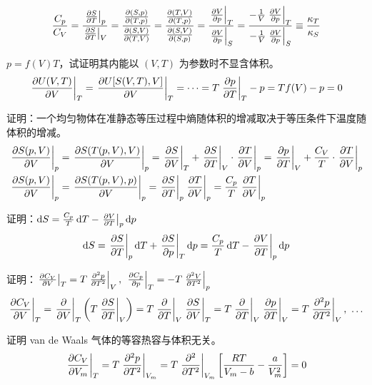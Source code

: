 \[
    \frac{C_p}{C_V} = \frac{\left.\pdv{S}{T}\right|_p}{\left.\pdv{S}{T}\right|_V} = \frac{\pdv{(S, p)}{(T, p)}}{\pdv{(S, V)}{(T, V)}} = \frac{\pdv{(T, V)}{(T, p)}}{\pdv{(S, V)}{(S, p)}} = \frac{\left.\pdv{V}{p}\right|_T}{\left.\pdv{V}{p}\right|_S} = \frac{- \frac{1}{V} \left.\pdv{V}{p}\right|_T}{- \frac{1}{V} \left.\pdv{V}{p}\right|_S} \equiv \frac{\kappa_T}{\kappa_S}
\]

\begin{framed}
    $p = f(V) T$，试证明其内能以 $(V, T)$ 为参数时不显含体积。
    \[
        \left.\pdv{U(V, T)}{V}\right|_T = \left.\pdv{U[S(V, T), V]}{V}\right|_T = \dots = T \left.\pdv{p}{T}\right|_T - p = T f(V) - p = 0
    \]
\end{framed}

\begin{framed}
    证明：一个均匀物体在准静态等压过程中熵随体积的增减取决于等压条件下温度随体积的增减。
    \begin{align*}
        \left.\pdv{S(p, V)}{V}\right|_p & = \left.\pdv{S(T(p, V), V)}{V}\right|_p = \left.\pdv{S}{V}\right|_T + \left.\pdv{S}{T}\right|_V \cdot \left.\pdv{T}{V}\right|_p = \left.\pdv{p}{T}\right|_V + \frac{C_V}{T} \cdot \left.\pdv{T}{V}\right|_p \\
        \left.\pdv{S(p, V)}{V}\right|_p & = \left.\pdv{S(T(p, V), p)}{V}\right|_p = \left.\pdv{S}{T}\right|_p \left.\pdv{T}{V}\right|_p = \frac{C_p}{T} \left.\pdv{T}{V}\right|_p
    \end{align*}
\end{framed}

\begin{framed}
    证明：$\dd{S} = \frac{C_p}{T} \dd{T} - \left.\pdv{V}{T}\right|_p \dd{p}$
    \[
        \dd{S} = \left.\pdv{S}{T}\right|_p \dd{T} + \left.\pdv{S}{p}\right|_T \dd{p} = \frac{C_p}{T} \dd{T} - \left.\pdv{V}{T}\right|_p \dd{p}
    \]
\end{framed}

\begin{framed}
    证明：$\left.\pdv{C_V}{V}\right|_T = T \left.\pdv[2]{p}{T}\right|_V,\ \left.\pdv{C_p}{p}\right|_T = - T \left.\pdv[2]{V}{T}\right|_p$
    \[
        \left.\pdv{C_V}{V}\right|_T = \left.\pdv{}{V}\right|_T
        \left(T\left.\pdv{S}{T}\right|_V\right) = T \left.\pdv{}{T}\right|_V \left.\pdv{S}{V}\right|_T = T \left.\pdv{}{T}\right|_V \left.\pdv{p}{T}\right|_V = T \left.\pdv[2]{p}{T}\right|_V,\ \dots
    \]
\end{framed}

\begin{framed}
    证明 van de Waals 气体的等容热容与体积无关。
    \[
        \left.\pdv{C_V}{V_m}\right|_T = T \left.\pdv[2]{p}{T}\right|_{V_m} = T \left.\pdv[2]{}{T}\right|_{V_m}\left[\frac{R T}{V_m - b} - \frac{a}{V_m^2}\right] = 0
    \]
\end{framed}

